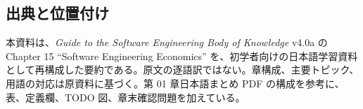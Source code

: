 \subsection*{出典と位置付け}

本資料は、\textit{Guide to the Software Engineering Body of Knowledge} v4.0a の Chapter 15 ``Software Engineering Economics'' を、初学者向けの日本語学習資料として再構成した要約である。原文の逐語訳ではない。章構成、主要トピック、用語の対応は原資料に基づく。第 01 章日本語まとめ PDF の構成を参考に、表、定義欄、TODO 図、章末確認問題を加えている。
